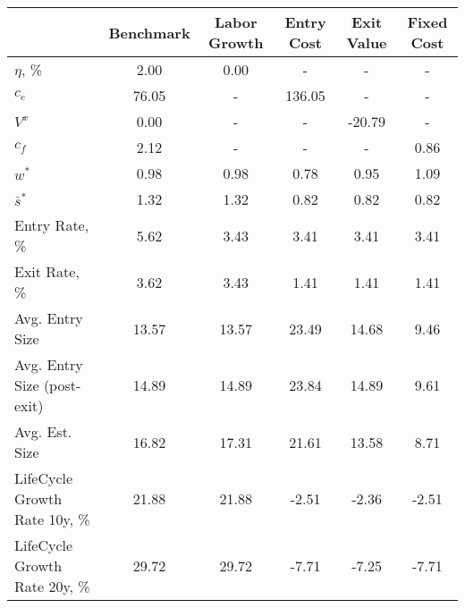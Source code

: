 \begin{tabular}{lccccc}
\toprule
{} & Benchmark & Labor Growth & Entry Cost & Exit Value & Fixed Cost \\
\midrule
$\eta$, \%                    &      2.00 &         0.00 &          - &          - &          - \\
$c_e$                         &     76.05 &            - &     136.05 &          - &          - \\
$V^x$                         &      0.00 &            - &          - &     -20.79 &          - \\
$c_f$                         &      2.12 &            - &          - &          - &       0.86 \\
$w^*$                         &      0.98 &         0.98 &       0.78 &       0.95 &       1.09 \\
$\bar{s}^*$                   &      1.32 &         1.32 &       0.82 &       0.82 &       0.82 \\
Entry Rate, \%                &      5.62 &         3.43 &       3.41 &       3.41 &       3.41 \\
Exit Rate, \%                 &      3.62 &         3.43 &       1.41 &       1.41 &       1.41 \\
Avg. Entry Size               &     13.57 &        13.57 &      23.49 &      14.68 &       9.46 \\
Avg. Entry Size (post-exit)   &     14.89 &        14.89 &      23.84 &      14.89 &       9.61 \\
Avg. Est. Size                &     16.82 &        17.31 &      21.61 &      13.58 &       8.71 \\
LifeCycle Growth Rate 10y, \% &     21.88 &        21.88 &      -2.51 &      -2.36 &      -2.51 \\
LifeCycle Growth Rate 20y, \% &     29.72 &        29.72 &      -7.71 &      -7.25 &      -7.71 \\
\bottomrule
\end{tabular}
